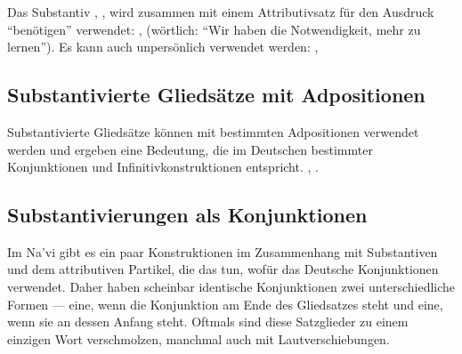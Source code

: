 \subsubsection{} Das Substantiv , , wird zusammen mit einem
Attributivsatz f\"ur den Ausdruck "`ben\"otigen"' verwendet: ,  (w\"ortlich: "`Wir haben die Notwendigkeit,
mehr zu lernen"').
Es kann auch unpers\"onlich verwendet werden: , 


\subsection{Substantivierte Glieds\"atze mit Adpositionen} Substantivierte Glieds\"atze
k\"onnen mit bestimmten Adpositionen verwendet werden und ergeben eine Bedeutung, die
im Deutschen bestimmter Konjunktionen und Infinitivkonstruktionen entspricht.
,
.
\label{syn:rel:nom-adp}


\subsubsection{} 



\subsection{Substantivierungen als Konjunktionen} Im Na’vi gibt es ein paar
Konstruktionen im Zusammenhang mit Substantiven und dem attributiven Partikel, die
das tun, wof\"ur das Deutsche Konjunktionen verwendet. Daher haben scheinbar identische
Konjunktionen zwei unterschiedliche Formen --- eine, wenn die Konjunktion am Ende des
Gliedsatzes steht und eine, wenn sie an dessen Anfang steht. Oftmals sind diese
Satzglieder zu einem einzigen Wort verschmolzen, manchmal auch mit Lautverschiebungen.

